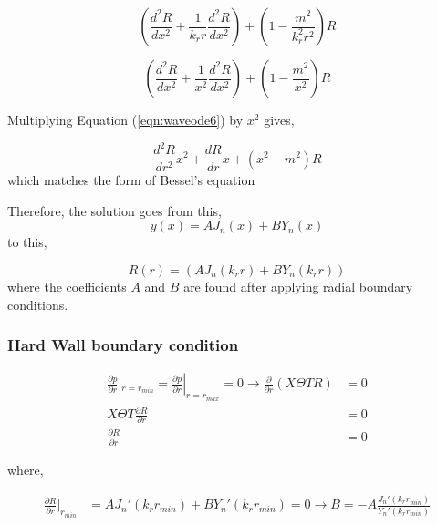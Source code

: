 \begin{equation}
    \left(\frac{d^2R}{dx^2} +
    \frac{1}{k_r r}\frac{d^2R}{dx^2}\right) +
    \left(1  - \frac{m^2}{k_r^2 r^2}\right)R
    \label{eqn:waveode5}
\end{equation}

\begin{equation}
    \left(\frac{d^2R}{dx^2} +
    \frac{1}{x^2}\frac{d^2R}{dx^2}\right) +
    \left(1  - \frac{m^2}{x^2}\right)R
    \label{eqn:waveode6}
\end{equation}

Multiplying Equation (\ref{eqn:waveode6}) by $x^2$ gives,

\begin{equation}
    \frac{d^2R}{dr^2}x^2 + 
    \frac{dR}{dr}x + 
    \left( x^2 - m^2 \right)R
    \label{eqn:finalradialode}
\end{equation}
which matches the form of Bessel's equation

Therefore, the solution goes from this,
\begin{equation}
    y(x) = AJ_n(x) + BY_n(x)
    \label{eqn:besselsolution}
\end{equation}
to this,


\begin{equation}
    R(r) = (AJ_n(k_r r) + BY_n(k_r r)) 
    \label{eqn:besselsolution}
\end{equation}
where the coefficients $A$ and $B$ are found after applying radial
boundary conditions. %




\subsubsection{Hard Wall boundary condition}
\begin{align*}
    \frac{\partial p}{\partial r}|_{r = r_{min}}  =\frac{\partial p}{\partial r}|_{r = r_{max}} = 0 \rightarrow 
    \frac{\partial}{\partial r} \left( X\Theta T R \right) &= 0 \\
    X \Theta T\frac{\partial R}{\partial r}  &= 0 \\
    \frac{\partial R}{\partial r}  &= 0 
\end{align*}

where,


\begin{align*} 
    \frac{ \partial R}{\partial r}|_{r_{min}} &= AJ_n'(k_r r_{min}) + B Y_n' (k_r r_{min}) = 0 
    \rightarrow B = -A \frac{J_n'(k_r r_{min})}{Y_n'(k_r r_{min})}
\end{align*}


